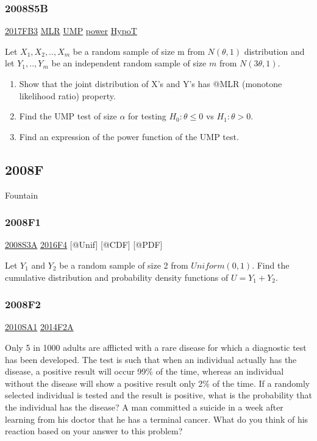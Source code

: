 \documentclass[10pt,twocolumn,portrait]{article}
\begin{document}
\hypertarget{s5b}{%
\subsubsection{2008S5B}\label{s5b}}

\protect\hyperlink{fb3-3}{2017FB3} \protect\hyperlink{section-7}{MLR}
\protect\hyperlink{section-7}{UMP} \protect\hyperlink{power}{power}
\protect\hyperlink{HypoT}{HypoT}

Let \(X_1,X_2,..,X_m\) be a random sample of size m from \(N(\theta,1)\)
distribution and let \(Y_1,..,Y_m\) be an independent random sample of
size \(m\) from \(N(3\theta,1)\).

\begin{enumerate}
\def\labelenumi{(\alph{enumi})}
\item
  Show that the joint distribution of X's and Y's has @MLR (monotone
  likelihood ratio) property.
\item
  Find the UMP test of size \(\alpha\) for testing \(H_0:\theta\le0\) vs
  \(H_1:\theta>0\).
\item
  Find an expression of the power function of the UMP test.
\end{enumerate}

\hypertarget{f-4}{%
\subsection{2008F}\label{f-4}}

Fountain

\hypertarget{f1-3}{%
\subsubsection{2008F1}\label{f1-3}}

\protect\hyperlink{s3a}{2008S3A} \protect\hyperlink{f4-6}{2016F4}
{[}@Unif{]} {[}@CDF{]} {[}@PDF{]}

Let \(Y_1\) and \(Y_2\) be a random sample of size 2 from
\(Uniform(0,1)\). Find the cumulative distribution and probability
density functions of \(U=Y_1+Y_2\).

\hypertarget{f2-3}{%
\subsubsection{2008F2}\label{f2-3}}

\protect\hyperlink{sa1-1}{2010SA1} \protect\hyperlink{f2a-1}{2014F2A}

Only 5 in 1000 adults are afflicted with a rare disease for which a
diagnostic test has been developed. The test is such that when an
individual actually has the disease, a positive result will occur 99\%
of the time, whereas an individual without the disease will show a
positive result only 2\% of the time. If a randomly selected individual
is tested and the result is positive, what is the probability that the
individual has the disease? A man committed a suicide in a week after
learning from his doctor that he has a terminal cancer. What do you
think of his reaction based on your answer to this problem?
\end{document}
